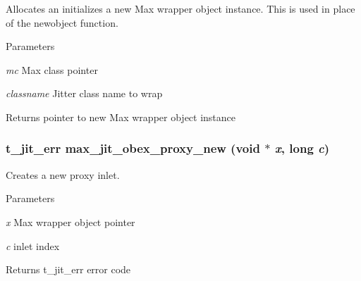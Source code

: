 Allocates an initializes a new Max wrapper object instance. This is used in place of the newobject function.


\begin{DoxyParams}{Parameters}
\item[{\em mc}]Max class pointer \item[{\em classname}]Jitter class name to wrap\end{DoxyParams}
\begin{DoxyReturn}{Returns}
pointer to new Max wrapper object instance 
\end{DoxyReturn}
\hypertarget{group__maxwrapmod_ga010c3e4a11d73d6553b7513719a19b7f}{
\subsubsection[{max\_\-jit\_\-obex\_\-proxy\_\-new}]{\setlength{\rightskip}{0pt plus 5cm}t\_\-jit\_\-err max\_\-jit\_\-obex\_\-proxy\_\-new (void $\ast$ {\em x}, \/  long {\em c})}}
\label{group__maxwrapmod_ga010c3e4a11d73d6553b7513719a19b7f}


Creates a new proxy inlet. 
\begin{DoxyParams}{Parameters}
\item[{\em x}]Max wrapper object pointer \item[{\em c}]inlet index\end{DoxyParams}
\begin{DoxyReturn}{Returns}
t\_\-jit\_\-err error code 
\end{DoxyReturn}
